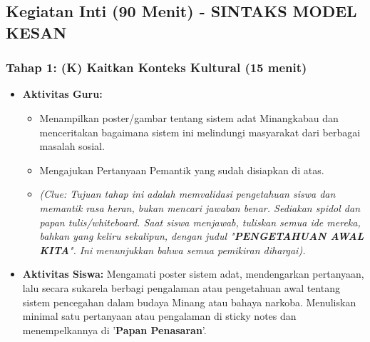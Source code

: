 \documentclass[a4paper,12pt]{article}
\begin{document}
\subsection{Kegiatan Inti (90 Menit) - SINTAKS MODEL KESAN}

\subsubsection{Tahap 1: (K) Kaitkan Konteks Kultural (15 menit)}
\begin{itemize}
\item \textbf{Aktivitas Guru:}
    \begin{itemize}
    \item Menampilkan poster/gambar tentang sistem adat Minangkabau dan menceritakan bagaimana sistem ini melindungi masyarakat dari berbagai masalah sosial.
    \item Mengajukan Pertanyaan Pemantik yang sudah disiapkan di atas.
    \item \textit{(Clue: Tujuan tahap ini adalah memvalidasi pengetahuan siswa dan memantik rasa heran, bukan mencari jawaban benar. Sediakan spidol dan papan tulis/whiteboard. Saat siswa menjawab, tuliskan semua ide mereka, bahkan yang keliru sekalipun, dengan judul "\textbf{PENGETAHUAN AWAL KITA}". Ini menunjukkan bahwa semua pemikiran dihargai).}
    \end{itemize}
\item \textbf{Aktivitas Siswa:} Mengamati poster sistem adat, mendengarkan pertanyaan, lalu secara sukarela berbagi pengalaman atau pengetahuan awal tentang sistem pencegahan dalam budaya Minang atau bahaya narkoba. Menuliskan minimal satu pertanyaan atau pengalaman di sticky notes dan menempelkannya di '\textbf{Papan Penasaran}'.
\end{itemize}
\end{document}
